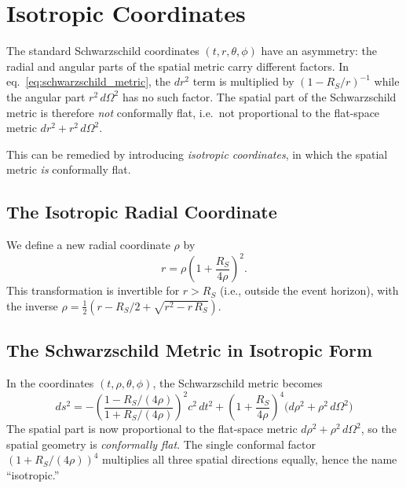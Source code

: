 \section{Isotropic Coordinates}
\label{sec:isotropic_coords}

The standard Schwarzschild coordinates $(t, r, \theta, \phi)$ have
an asymmetry: the radial and angular parts of the spatial
metric carry different factors.  In
eq.~\eqref{eq:schwarzschild_metric}, the $dr^2$ term is multiplied by
$(1 - R_S/r)^{-1}$ while the angular part $r^2\,d\Omega^2$ has no such
factor.  The spatial part of the Schwarzschild metric is therefore
\emph{not} conformally flat, i.e.\ not proportional to the
flat-space metric $dr^2 + r^2\,d\Omega^2$.

This can be remedied by introducing \emph{isotropic coordinates}, in
which the spatial metric \emph{is} conformally flat.

\subsection{The Isotropic Radial Coordinate}

We define a new radial coordinate $\rho$ by
\begin{equation}
    r = \rho\left(1 + \frac{R_S}{4\rho}\right)^{\!2} .
    \label{eq:isotropic_r}
\end{equation}
This transformation is invertible for $r > R_S$ (i.e., outside the
event horizon), with the inverse
$\rho = \tfrac{1}{2}(r - R_S/2 + \sqrt{r^2 - r\,R_S})$.

\subsection{The Schwarzschild Metric in Isotropic Form}

In the coordinates $(t, \rho, \theta, \phi)$, the Schwarzschild
metric becomes
\begin{equation}
    \boxed{
    ds^2 = -\left(\frac{1 - R_S/(4\rho)}{1 + R_S/(4\rho)}\right)^{\!2}
    c^2\, dt^2
    + \left(1 + \frac{R_S}{4\rho}\right)^{\!4}
    \bigl(d\rho^2 + \rho^2\, d\Omega^2\bigr)
    }
    \label{eq:schwarzschild_isotropic}
\end{equation}
The spatial part is now proportional to
the flat-space metric $d\rho^2 + \rho^2\,d\Omega^2$, so
the spatial geometry is \emph{conformally flat}.  The single
conformal factor $(1 + R_S/(4\rho))^4$ multiplies all three spatial
directions equally, hence the name ``isotropic.''

